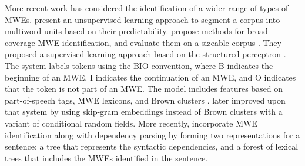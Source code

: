 \documentclass[11pt,a4paper]{article}
\begin{document}
More-recent work has considered the identification of a wider range of
types of MWEs.  present an
unsupervised learning approach to segment a corpus into multiword
units based on their predictability.
 propose methods for
broad-coverage MWE identification, and evaluate them on a sizeable
corpus \cite{schneider2014comprehensive}. They proposed a supervised
learning approach based on the structured perceptron
\cite{collins2002discriminative}. The system labels tokens using the
     {\selectfont BIO} convention, where
     {\selectfont B} indicates the beginning of an
     MWE, {\selectfont I} indicates the continuation
     of an MWE, and {\selectfont O} indicates that
     the token is not part of an MWE. The model includes features
     based on part-of-speech tags, MWE lexicons, and Brown clusters
     \cite{DBLP:journals/coling/BrownPdLM92}.  
     later improved upon that system by using skip-gram embeddings
     \cite{mikolov2013distributed} instead of Brown clusters with a
     variant of conditional random fields. More recently,
      incorporate MWE
     identification along with dependency parsing by forming two
     representations for a sentence: a tree that represents the
     syntactic dependencies, and a forest of lexical trees that
     includes the MWEs identified in the sentence.





\end{document}
